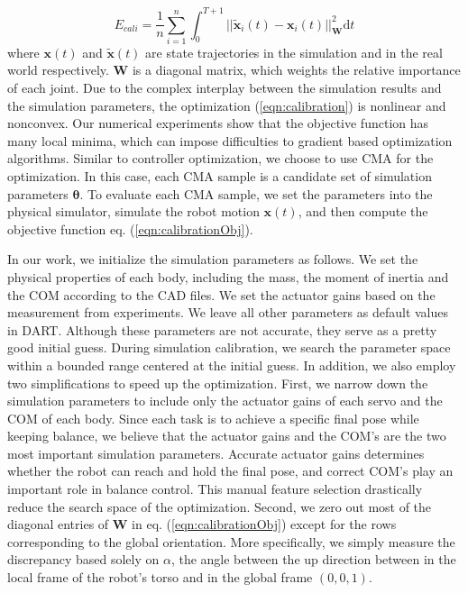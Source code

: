 \begin{equation}
  E_{cali}=\frac{1}{n}\sum_{i=1}^{n}\int_{0}^{T+1}||\tilde{\mathbf{x}}_i(t)-\mathbf{x}_i(t)||_{\mathbf{W}}^2\mathrm{d}t
  \label{eqn:calibrationObj}
\end{equation}
where $\mathbf{x}(t)$ and $\tilde{\mathbf{x}}(t)$ are state trajectories in the simulation and in the real world respectively. $\mathbf{W}$ is a diagonal matrix, which weights the relative importance of each joint. Due to the complex interplay between the simulation results and the simulation parameters, the optimization (\ref{eqn:calibration}) is nonlinear and nonconvex.  Our numerical experiments show that the objective function has many local minima, which can impose difficulties to gradient based optimization algorithms. Similar to controller optimization, we choose to use CMA for the optimization. In this case, each CMA sample is a candidate set of simulation parameters $\mathbf{\theta}$. To evaluate each CMA sample, we set the parameters into the physical simulator, simulate the robot motion $\mathbf{x}(t)$, and then compute the objective function eq. (\ref{eqn:calibrationObj}).

In our work, we initialize the simulation parameters as follows. We set the physical properties of each body, including the mass, the moment of inertia and the COM according to the CAD files. We set the actuator gains based on the measurement from experiments. We leave all other parameters as default values in DART. Although these parameters are not accurate, they serve as a pretty good initial guess. During simulation calibration, we search the parameter space within a bounded range centered at the initial guess. In addition, we also employ two simplifications to speed up the optimization. First, we narrow down the simulation parameters to include only the actuator gains of each servo and the COM of each body. Since each task is to achieve a specific final pose while keeping balance, we believe that the actuator gains and the COM's are the two most important simulation parameters. Accurate actuator gains determines whether the robot can reach and hold the final pose, and correct COM's play an important role in balance control. This manual feature selection drastically reduce the search space of the optimization. Second, we zero out most of the diagonal entries of $\mathbf{W}$ in eq. (\ref{eqn:calibrationObj}) except for the rows corresponding to the global orientation. More specifically, we simply measure the discrepancy based solely on $\alpha$, the angle between the up direction between in the local frame of the robot's torso and in the global frame $(0,0,1)$.

